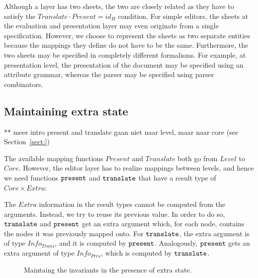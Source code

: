 Although a layer has two sheets, the two are closely related as they have to satisfy the
$Translate \cdot Present = id_{H}$ condition. For simple editors, the sheets at the evaluation and presentation layer may even originate from a single specification. However, we choose to represent the sheets as two separate entities because the mappings they define do not have to be the same.  Furthermore, the two sheets may be specified in completely different formalisms. For example, at presentation level, the presentation of the document may be specified using an attribute grammar, whereas the parser may be specified using parser combinators.


%																
%																
%																
\subsection{Maintaining extra state} \label{sect:maintainingExtraState}

** meer intro
present and translate gaan niet naar level, maar naar core (see Section~\ref{sect:})

The available mapping functions $Present$ and $Translate$ both go from $Level$ to $Core$. However, the editor layer has to realize mappings between levels, and hence we need functions ${\tt present}$ and ${\tt translate}$ that have a result type of $Core \times Extra$:


The $Extra$ information in the result types cannot be computed from the arguments. Instead, we try to reuse its previous value. In order to do so, ${\tt translate}$ and ${\tt present}$ get an extra argument which, for each node, contains the nodes it was previously mapped onto. For ${\tt translate}$, the extra argument is of type $Info_{Trans}$, and it is computed by ${\tt present}$. Analogously, ${\tt present}$ gets an extra argument of type $Info_{Pres}$, which is computed by ${\tt translate}$. 


\begin{figure}
\begin{center}
\begin{center}
\end{center}
\caption{Maintaing the invariants in the presence of extra state.}\label{layerExtraState} 
\end{center}
\end{figure}


